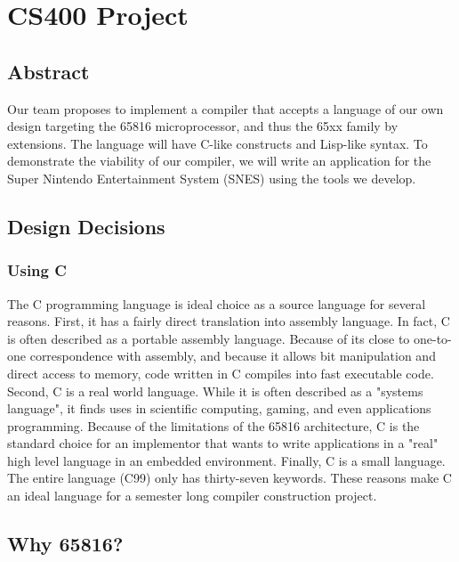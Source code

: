 \documentclass {article}
\begin{document}
\section {CS400 Project}
\subsection{Abstract}

Our team proposes to implement a compiler that accepts a language of
our own design targeting the 65816 microprocessor, and thus the 65xx
family by extensions.  The language will have C-like constructs and
Lisp-like syntax.  To demonstrate the viability of our compiler, we
will write an application for the Super Nintendo Entertainment System
(SNES) using the tools we develop.

\subsection{Design Decisions}
\subsubsection{Using C}

The C programming language is ideal choice as a source language for
several reasons.  First, it has a fairly direct translation into
assembly language.  In fact, C is often described as a portable
assembly language.  Because of its close to one-to-one correspondence
with assembly, and because it allows bit manipulation and direct
access to memory, code written in C compiles into fast executable
code.  Second, C is a real world language.  While it is often
described as a "systems language", it finds uses in scientific
computing, gaming, and even applications programming. Because of the
limitations of the 65816 architecture, C is the standard choice for an
implementor that wants to write applications in a "real" high level
language in an embedded environment. Finally, C is a small language.
The entire language (C99) only has thirty-seven keywords.  These
reasons make C an ideal language for a semester long compiler
construction project.

\subsection{Why 65816?}
\end{document}
